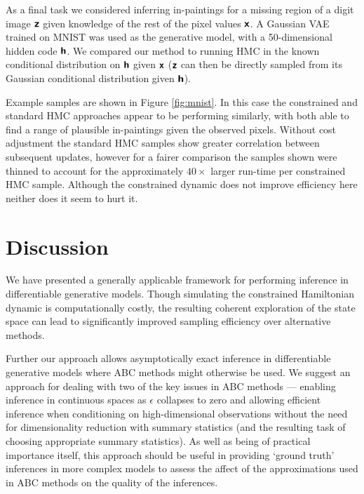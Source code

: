As a final task we considered inferring in-paintings for a missing region of a digit image $\boldsymbol{\mathsf{z}}$ given knowledge of the rest of the pixel values $\boldsymbol{\mathsf{x}}$. A Gaussian \ac{VAE} trained on MNIST was used as the generative model, with a 50-dimensional hidden code $\boldsymbol{\mathsf{h}}$. We compared our method to running \ac{HMC} in the known conditional distribution on $\boldsymbol{\mathsf{h}}$ given $\boldsymbol{\mathsf{x}}$ ($\boldsymbol{\mathsf{z}}$ can then be directly sampled from its Gaussian conditional distribution given $\boldsymbol{\mathsf{h}}$).

Example samples are shown in Figure \ref{fig:mnist}. In this case the constrained and standard \ac{HMC} approaches appear to be performing similarly, with both able to find a range of plausible in-paintings given the observed pixels. Without cost adjustment the standard \ac{HMC} samples show greater correlation between subsequent updates, however for a fairer comparison the samples shown were thinned to account for the approximately $40\times$ larger run-time per constrained \ac{HMC} sample. Although the constrained dynamic does not improve efficiency here neither does it seem to hurt it.

\section{Discussion}

We have presented a generally applicable framework for performing inference in differentiable generative models. Though simulating the constrained Hamiltonian dynamic is computationally costly, the resulting coherent exploration of the state space can lead to significantly improved sampling efficiency over alternative methods.

Further our approach allows asymptotically exact inference in differentiable generative models where \ac{ABC} methods might otherwise be used. We suggest an approach for dealing with two of the key issues in \ac{ABC} methods --- enabling inference in continuous spaces as $\epsilon$ collapses to zero and allowing efficient inference when conditioning on high-dimensional observations without the need for dimensionality reduction with summary statistics (and the resulting task of choosing appropriate summary statistics). As well as being of practical importance itself, this approach should be useful in providing `ground truth' inferences in more complex models to assess the affect of the approximations used in \ac{ABC} methods on the quality of the inferences.

